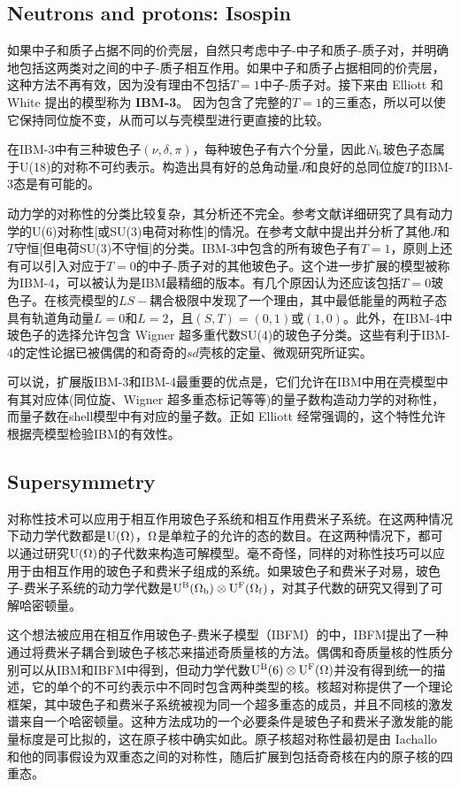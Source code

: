 \subsection{Neutrons and protons: Isospin}

如果中子和质子占据不同的价壳层，自然只考虑中子-中子和质子-质子对，并明确地包括这两类对之间的中子-质子相互作用。如果中子和质子占据相同的价壳层，这种方法不再有效，因为没有理由不包括$T=1$中子-质子对。接下来由 Elliott 和 White 提出的模型称为 \textbf{IBM-3}。 因为包含了完整的$T=1$的三重态，所以可以使它保持同位旋不变，从而可以与壳模型进行更直接的比较。

在IBM-3中有三种玻色子$(\nu,\delta,\pi)$，每种玻色子有六个分量，因此$N_{\rm b}$玻色子态属于U(18)的对称不可约表示。构造出具有好的总角动量$J$和良好的总同位旋$T$的IBM-3态是有可能的。

动力学的对称性的分类比较复杂，其分析还不完全。参考文献详细研究了具有动力学的U(6)对称性[或SU(3)电荷对称性]的情况。在参考文献中提出并分析了其他$J$和$T$守恒[但电荷SU(3)不守恒]的分类。IBM-3中包含的所有玻色子有$T=1$，原则上还有可以引入对应于$T=0$的中子-质子对的其他玻色子。这个进一步扩展的模型被称为IBM-4，可以被认为是IBM最精细的版本。有几个原因认为还应该包括$T=0$玻色子。在核壳模型的$LS-$耦合极限中发现了一个理由，其中最低能量的两粒子态具有轨道角动量$L=0$和$L=2$，且$(S,T)=(0,1)$或$(1,0)$。此外，在IBM-4中玻色子的选择允许包含 Wigner 超多重代数SU(4)的玻色子分类。这些有利于IBM-4的定性论据已被偶偶的和奇奇的$sd$壳核的定量、微观研究所证实。

可以说，扩展版IBM-3和IBM-4最重要的优点是，它们允许在IBM中用在壳模型中有其对应体(同位旋、Wigner 超多重态标记等等)的量子数构造动力学的对称性，而量子数在shell模型中有对应的量子数。正如 Elliott 经常强调的，这个特性允许根据壳模型检验IBM的有效性。

\subsection{Supersymmetry}

对称性技术可以应用于相互作用玻色子系统和相互作用费米子系统。在这两种情况下动力学代数都是${\rm U(\Omega)}$，${\rm \Omega}$是单粒子的允许的态的数目。在这两种情况下，都可以通过研究${\rm U(\Omega)}$的子代数来构造可解模型。毫不奇怪，同样的对称性技巧可以应用于由相互作用的玻色子和费米子组成的系统。如果玻色子和费米子对易，玻色子-费米子系统的动力学代数是${\rm U^B(\Omega_b)\otimes U^F(\Omega_f)}$，对其子代数的研究又得到了可解哈密顿量。

这个想法被应用在相互作用玻色子-费米子模型（IBFM）的中，IBFM提出了一种通过将费米子耦合到玻色子核芯来描述奇质量核的方法。偶偶和奇质量核的性质分别可以从IBM和IBFM中得到，但动力学代数${\rm U^B(6)\otimes U^F(\Omega)}$并没有得到统一的描述，它的单个的不可约表示中不同时包含两种类型的核。核超对称提供了一个理论框架，其中玻色子和费米子系统被视为同一个超多重态的成员，并且不同核的激发谱来自一个哈密顿量。这种方法成功的一个必要条件是玻色子和费米子激发能的能量标度是可比拟的，这在原子核中确实如此。原子核超对称性最初是由 Iachallo 和他的同事假设为双重态之间的对称性，随后扩展到包括奇奇核在内的原子核的四重态。


